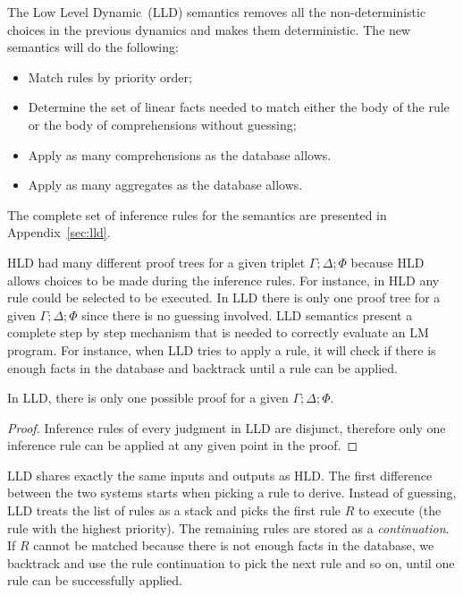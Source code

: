 The Low Level Dynamic~(LLD) semantics removes all the non-deterministic choices
in the previous dynamics and makes them deterministic. The new semantics will do
the following:

\begin{itemize}

   \item Match rules by priority order;

   \item Determine the set of linear facts needed to match either the body of
   the rule or the body of comprehensions without guessing;

   \item Apply as many comprehensions as the database allows.

   \item Apply as many aggregates as the database allows.

\end{itemize}

The complete set of inference rules for the semantics are presented in
Appendix~\ref{sec:lld}.

HLD had many different proof trees for a given triplet $\Gamma; \Delta; \Phi$
because HLD allows choices to be made during the inference rules. For instance,
in HLD any rule could be selected to be executed. In LLD there is only
one proof tree for a given $\Gamma; \Delta; \Phi$ since there is no
guessing involved. LLD semantics present a complete step by step
mechanism that is needed to correctly evaluate an LM program. For
instance, when LLD tries to apply a rule, it will check if there is
enough facts in the database and backtrack until a rule can be applied.

\begin{theorem}
In LLD, there is only one possible proof for a given $\Gamma; \Delta; \Phi$.
\end{theorem}
\begin{proof}

Inference rules of every judgment in LLD are disjunct, therefore only one
inference rule can be applied at any given point in the proof.

\end{proof}

LLD shares exactly the same inputs and outputs as HLD. The first difference
between the two systems starts when picking a rule to derive.  Instead of
guessing, LLD treats the list of rules as a stack and picks the first rule $R$
to execute (the rule with the highest priority). The remaining rules are stored
as a \emph{continuation}. If $R$ cannot be matched because there is not enough
facts in the database, we backtrack and use the rule continuation to pick the
next rule and so on, until one rule can be successfully applied.

